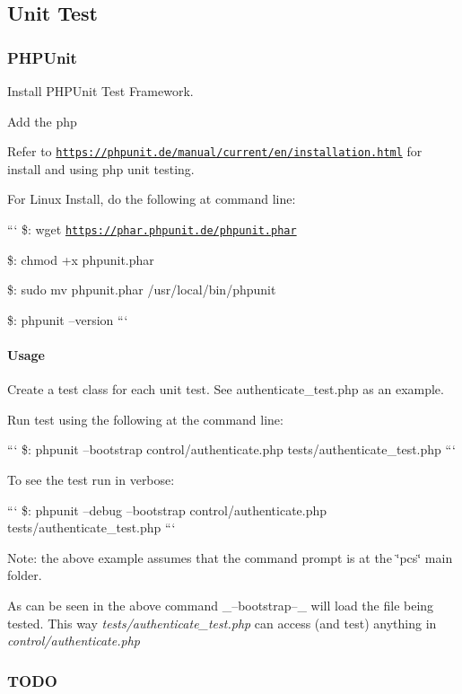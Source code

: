 \subsection*{Unit Test}





\subsubsection*{P\-H\-P\-Unit}

Install P\-H\-P\-Unit Test Framework.

Add the php

Refer to \href{https://phpunit.de/manual/current/en/installation.html}{\tt https\-://phpunit.\-de/manual/current/en/installation.\-html} for install and using php unit testing.

For Linux Install, do the following at command line\-:

``` \$\-: wget \href{https://phar.phpunit.de/phpunit.phar}{\tt https\-://phar.\-phpunit.\-de/phpunit.\-phar}

\$\-: chmod +x phpunit.\-phar

\$\-: sudo mv phpunit.\-phar /usr/local/bin/phpunit

\$\-: phpunit --version ```

\paragraph*{Usage}

Create a test class for each unit test. See authenticate\-\_\-test.\-php as an example.

Run test using the following at the command line\-:

``` \$\-: phpunit --bootstrap control/authenticate.\-php tests/authenticate\-\_\-test.\-php ```

To see the test run in verbose\-:

``` \$\-: phpunit --debug --bootstrap control/authenticate.\-php tests/authenticate\-\_\-test.\-php ```

Note\-: the above example assumes that the command prompt is at the \char`\"{}pcs\char`\"{} main folder.

As can be seen in the above command \-\_\---bootstrap--\-\_\- will load the file being tested. This way {\itshape tests/authenticate\-\_\-test.\-php} can access (and test) anything in {\itshape control/authenticate.\-php}

\subsubsection*{T\-O\-D\-O}

